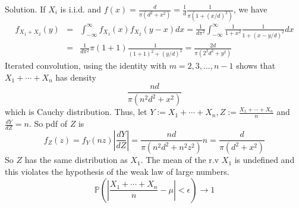 Solution. If $X_i$ is i.i.d. and  $f(x)=\frac{d}{\pi(d^2+x^2)}=\frac 1d\frac{1}{\pi(1+(x/d)^2)}$, we have
\begin{eqnarray}
f_{X_1+X_2}\left(y\right) & = & \int^\infty_{-\infty} f_{X_1}(x)f_{X_2}(y-x)dx = \frac{1}{d\pi^2}\int^\infty_{-\infty} \frac{1}{1+x^2}\frac{1}{1+(x-y/d)^2}dx \nonumber\\
& = & \frac{1}{d\pi^2} \pi (1+1)\frac{1}{(1+1)^2+(y/d)^2} = \frac{2d}{\pi(2^2d^2+y^2)}
\end{eqnarray}
Iterated convolution, using the identity with $m=2,3,\dots,n-1$ shows that $X_1+\cdots+X_n$ has density 
\begin{equation}
\frac{nd}{\pi(n^2d^2+x^2)}
\end{equation}
which is Cauchy distribution. Thus, let $Y:=X_1+\cdots+X_n,Z:=\frac{X_1+\cdots+X_n}{n}$ and $\frac{dY}{dZ}=n$. So pdf of $Z$ is
\begin{equation}
f_Z(z) = f_Y(nz)\left|\frac{dY}{dZ}\right| = \frac{nd}{\pi(n^2d^2+n^2z^2)} n = \frac{d}{\pi(d^2+x^2)}
\end{equation}
So $Z$ has the same distribution as $X_1$. The mean of the r.v $X_1$ is undefined and this violates the hypothesis of the weak law of large numbers.
\begin{equation}
\mathbb{P}\left(\left|\frac{X_1+\cdots+X_n}{n}-\mu\right|<\epsilon\right)\to 1
\end{equation}  



\een






%


